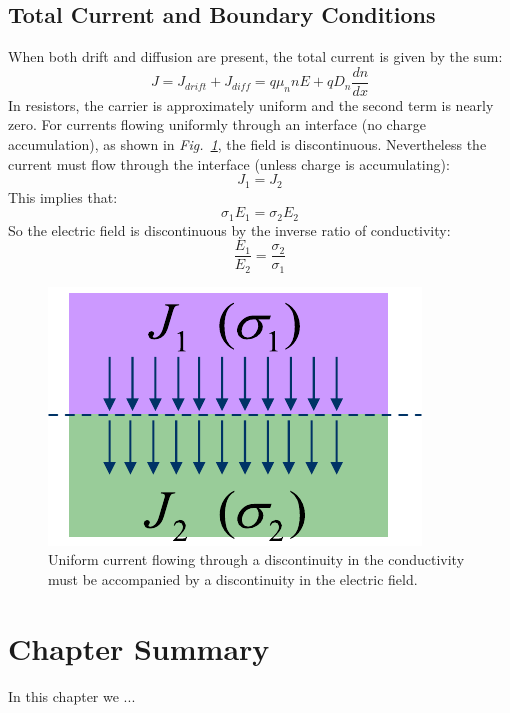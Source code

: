 \subsection{Total Current and Boundary Conditions}
When both drift and diffusion are present, the total current is given by the sum:
    \begin{equation}
        J = {J_{drift}} + {J_{diff}} = q{\mu _n}nE + q{D_n}\frac{{dn}}{{dx}}
    \end{equation}
In resistors, the carrier is approximately uniform and the second term is nearly zero. For currents flowing uniformly through an interface (no charge accumulation), as shown in \emph{Fig.~\ref{fig:slide50}}, the field is discontinuous.  Nevertheless the current must flow through the interface (unless charge is accumulating):
    \begin{equation}
        {J_1} = {J_2}
    \end{equation}
This implies that:
    \begin{equation}
        {\sigma _1}{E_1} = {\sigma _2}{E_2}
    \end{equation}
So the electric field is discontinuous by the inverse ratio of conductivity:
    \begin{equation}
        \frac{{{E_1}}}{{{E_2}}} = \frac{{{\sigma _2}}}{{{\sigma _1}}}
    \end{equation}
\begin{figure}[H]
\centering
\includegraphics[width=.45\columnwidth]{slide50}
\caption{Uniform current flowing through a discontinuity in the conductivity must be accompanied by a discontinuity in the electric field.}
\label{fig:slide50}
\end{figure}
\newpage
\section{Chapter Summary}
In this chapter we ...
